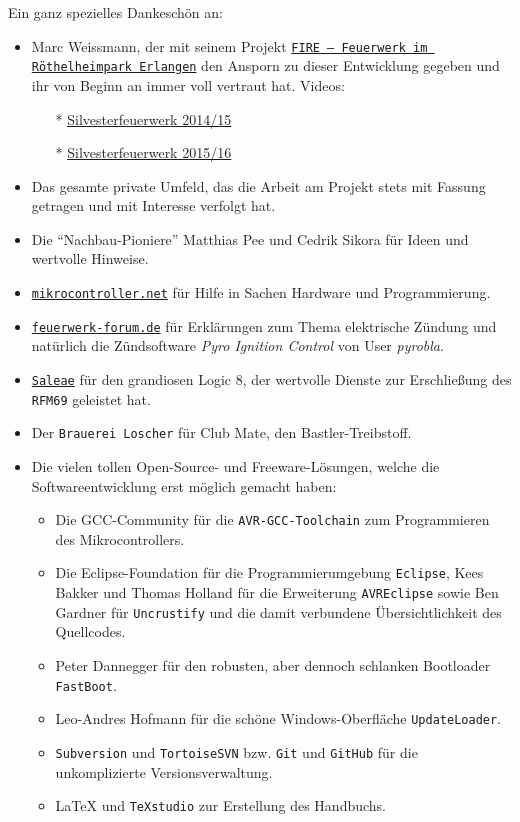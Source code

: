 \documentclass[pdftex, parskip, numbers=noenddot, toc=listof]{scrbook}
\newcommand{\pic}{\emph{Pyro Ignition Control}}
\begin{document}
			Ein ganz spezielles Dankeschön an:
			\begin{itemize}
				\item Marc Weissmann, der mit seinem Projekt \href{http://www.facebook.com/FIREErlangen}{\texttt{FIRE -- Feuerwerk im Röthelheimpark Erlangen}} den Ansporn zu dieser Entwicklung gegeben und ihr von Beginn an immer voll vertraut hat. Videos:
				      \begin{itemize}
				      	\item[*] \underline{\href{https://vimeo.com/116115628}{Silvesterfeuerwerk 2014/15}}
				      	\item[*] \underline{\href{https://vimeo.com/150594996}{Silvesterfeuerwerk 2015/16}}
				      \end{itemize}
				\item Das gesamte private Umfeld, das die Arbeit am Projekt stets mit Fassung getragen und mit Interesse verfolgt hat.
				\item Die \enquote{Nachbau-Pioniere} Matthias Pee und Cedrik Sikora für Ideen und wertvolle Hinweise.
				\item \href{http://www.mikrocontroller.net}{\texttt{mikrocontroller.net}} für Hilfe in Sachen Hardware und Programmierung.
				\item \href{http://www.feuerwerk-forum.de}{\texttt{feuerwerk-forum.de}} für Erklärungen zum Thema elektrische Zündung und natürlich die Zündsoftware {\pic} von User \emph{pyrobla}.
				\item \href{http://www.saleae.com}{\texttt{Saleae}} für den grandiosen Logic 8, der wertvolle Dienste zur Erschließung des \texttt{RFM69} geleistet hat.
				\item Der \texttt{Brauerei Loscher} für Club Mate, den Bastler-Treibstoff.
				\item Die vielen tollen Open-Source- und Freeware-Lösungen, welche die Softwareentwicklung erst möglich gemacht haben:
				      \begin{itemize}
				      	\item Die GCC-Community für die \texttt{AVR-GCC-Toolchain} zum Programmieren des Mikrocontrollers.
				      	\item Die Eclipse-Foundation für die Programmierumgebung \texttt{Eclipse}, Kees Bakker und Thomas Holland für die Erweiterung \texttt{AVREclipse} sowie Ben Gardner für \texttt{Uncrustify} und die damit verbundene Übersichtlichkeit des Quellcodes.
				      	\item Peter Dannegger für den robusten, aber dennoch schlanken Bootloader \texttt{FastBoot}.
				      	\item Leo-Andres Hofmann für die schöne Windows-Oberfläche \texttt{UpdateLoader}.
				      	\item \texttt{Subversion} und \texttt{TortoiseSVN} bzw. \texttt{Git} und \texttt{GitHub} für die unkomplizierte Versionsverwaltung.
				      	\item {\LaTeX} und \texttt{TeXstudio} zur Erstellung des Handbuchs.
				      \end{itemize}
			\end{itemize}
\end{document}

